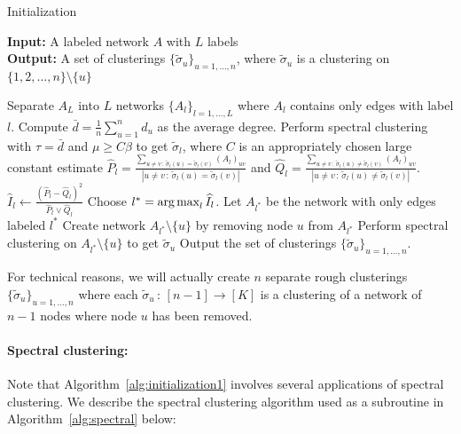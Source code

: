 \documentclass{article}
\begin{document}
\begin{algorithm}[h!]
\caption{Initialization}
\label{alg:initialization1}
\textbf{Input:} A labeled network $A$ with $L$ labels \\
\textbf{Output:} A set of clusterings $\{ \tilde{\sigma}_u \}_{u=1,...,n}$, where $\tilde \sigma_u$ is a clustering on $\{1, 2, \dots, n\} \setminus \{u\}$\\

\begin{algorithmic}[1]
\State Separate $A_L$ into $L$ networks $\{ A_l \}_{l=1, \dots, L}$ where $A_l$ contains only edges with label $l$.  
   \State Compute $\bar{d} = \frac{1}{n} \sum_{u=1}^n d_u$ as the average degree.
   \State Perform spectral clustering with $\tau = \bar{d}$ and $\mu \geq C\beta$ to get $\tilde{\sigma}_l$, where $C$ is an appropriately chosen large constant
   \State estimate $\hat{P}_l = 
             \frac{ \sum_{u \neq v \,:\, \tilde{\sigma}_l(u) = \tilde{\sigma}_l(v) } (A_l)_{uv} }
                  { |{u \neq v \,:\, \tilde{\sigma}_l(u) = \tilde{\sigma}_l(v) }| }$ and 
               $\hat{Q}_l = 
            \frac{ \sum_{u \neq v \,:\, \tilde{\sigma}_l(u) \neq \tilde{\sigma}_l(v) } (A_l)_{uv} }
              { |{u \neq v \,:\, \tilde{\sigma}_l(u) \neq \tilde{\sigma}_l(v) }| }$. 
   \State $\hat{I}_l \leftarrow 
               \frac{ (\hat{P}_l - \hat{Q}_l)^2}{\hat{P}_l \vee \hat{Q}_l}$
\EndFor
\State Choose $l^* = \mathop{\text{\rm arg\,max}}_l \widehat{I}_l$. Let $A_{l^*}$ be the network with only edges labeled $l^*$
  
   \State Create network $A_{l^*} \setminus \{u\}$ by removing node $u$ from $A_{l^*}$
   \State Perform spectral clustering on $A_{l^*} \setminus \{ u \}$ to get $\tilde{\sigma}_u$
\EndFor 
\State Output the set of clusterings $\{ \tilde{\sigma}_u \}_{u=1, \dots, n}$.
\end{algorithmic}
\end{algorithm}

For technical reasons, we will actually create $n$ separate rough clusterings $\{\tilde{\sigma}_u \}_{u = 1, \dots, n}$ where each $\tilde{\sigma}_u \,:\, [n-1] \rightarrow [K]$ is a clustering of a network of $n-1$ nodes where node $u$ has been removed.

\paragraph{\textbf{Spectral clustering:}} Note that Algorithm~\ref{alg:initialization1} involves several applications of spectral clustering. We describe the spectral clustering algorithm used as a subroutine in Algorithm~\ref{alg:spectral} below:
\end{document}
